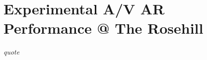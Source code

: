 \chapter{Experimental A/V AR Performance @ The Rosehill}
\label{sec: performance}
\epigraph{\emph{quote}}{\citep[]{bilbow2022}}
